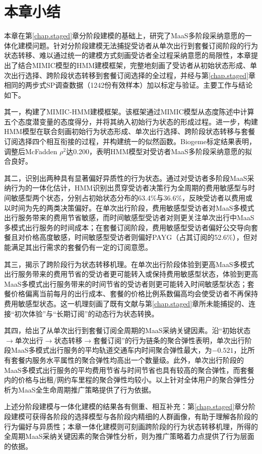\section{本章小结}\label{sec.int.summary}

本章在第\ref{chap.staged}章分阶段建模的基础上，研究了MaaS多阶段采纳意愿的一体化建模问题。针对分阶段建模无法捕捉受访者从单次出行到套餐订阅阶段的行为状态转移、难以通过统一的建模方式刻画受访者全过程采纳意愿的局限性，本章提出了结合MIMIC模型的HMM建模框架，完整地刻画了受访者从初始状态形成、单次出行选择、跨阶段状态转移到套餐订阅选择的全过程，并经与第\ref{chap.staged}章相同的两步式SP调查数据（1242份有效样本）加以标定与验证。主要工作与结论如下。

其一，构建了MIMIC-HMM建模框架。该框架通过MIMIC模型从态度陈述中计算五个态度潜变量的态度得分，并将其纳入初始行为状态的形成过程。进一步，构建HMM模型在联合刻画初始行为状态形成、单次出行选择、跨阶段状态转移与套餐订阅选择四个相互衔接的过程，并构建统一的似然函数。Biogeme标定结果表明，调整后McFadden $\rho^2$达0.200，表明HMM模型对受访者MaaS多阶段采纳意愿的拟合良好。

其二，识别出两种具有显著偏好异质性的行为状态。通过对受访者多阶段MaaS采纳行为的一体化估计，HMM识别出贯穿受访者决策行为全周期的费用敏感型与时间敏感型两个状态，分别占初始状态分布的63.4\%与36.6\%，反映受访者以费用或以时间为先的两类决策偏好。在单次出行阶段，费用敏感型受访者对MaaS多模式出行服务带来的费用节省敏感，而时间敏感型受访者对则更关注单次出行中MaaS多模式出行服务的时间成本；在套餐订阅阶段，费用敏感型受访者偏好公交导向套餐且对价格高度敏感，时间敏感型受访者则偏好PAYG（占其订阅的52.6\%），但对能满足其出行需求的套餐仍有一定的订阅意愿。

其三，揭示了跨阶段行为状态转移机理。在单次出行阶段体验到更高MaaS多模式出行服务带来的费用节省的受访者更可能转入或保持费用敏感型状态，体验到更高MaaS多模式出行服务带来的时间节省的受访者则更可能转入时间敏感型状态；套餐价格偏离当前每月的出行成本、套餐的价格比例系数偏高均会使受访者不再保持费用敏感型状态。这一机理刻画了既有文献与第\ref{chap.staged}章所未能捕捉的、连接``初次体验''与``长期订阅''的动态行为状态转换。

其四，给出了从单次出行到套餐订阅全周期的MaaS采纳关键因素。沿``初始状态$\rightarrow$单次出行$\rightarrow$状态转移$\rightarrow$套餐订阅''的行为链条的聚合弹性表明，单次出行阶段MaaS多模式出行服务的平均轨道交通车内时间聚合弹性最大，为$-0.521$，比所有套餐内服务水平属性的聚合弹性均高出一个数量级。此外，单次出行阶段的MaaS多模式出行服务的平均费用节省与时间节省也具有较高的聚合弹性，而套餐内的价格与出租/网约车里程的聚合弹性均较小。以上针对全体用户的聚合弹性分析为MaaS全生命周期推广策略提供了行为依据。

上述分阶段建模与一体化建模的结果各有侧重、相互补充：第\ref{chap.staged}章分阶段建模可获得各阶段的选择模型与各阶段内精细的人群画像，有助于理解各阶段的行为偏好与异质性；本章一体化建模则可刻画跨阶段的行为状态转移机理，所得的全周期MaaS采纳关键因素的聚合弹性分析，则为推广策略着力点提供了行为层面的依据。
